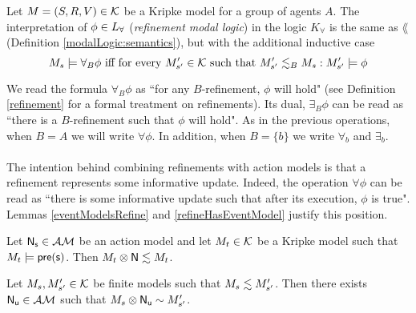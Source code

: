 \begin{defn} \label{refineLogic:semantics}
Let $M = (S, R, V) \in \mathcal{K}$ be a Kripke model for a group of agents $A$.
The interpretation of $\phi \in L_{\forall}$ ({\em refinement modal logic}) in the logic $K_\forall$ is the same as $\lang$
(Definition \ref{modalLogic:semantics}), but with the additional inductive case
\[
	M_s \models \forall_B \phi \text{ iff for every } M'_{s'} \in
  \mathcal{K} \text{ such that } M'_{s'}
	\lesssim_B M_s : M'_{s'} \models \phi
\]
\end{defn}

We read the formula $\forall_B \phi$ as ``for any $B$-refinement, $\phi$ will hold" (see Definition
\ref{refinement} for a formal treatment on refinements).
Its dual, $\exists_B \phi$ can be read as ``there is a $B$-refinement such that $\phi$ will hold".
As in the previous operations, when $B = A$ we will write $\forall \phi$.
In addition, when $B = \{b\}$ we write $\forall_b$ and $\exists_b$.\\
\\
The intention behind combining refinements with action models is that a refinement represents some
informative update.
Indeed, the operation $\forall \phi$ can be read as ``there is some informative update such that
after its execution, $\phi$ is true".
Lemmas \ref{eventModelsRefine} and \ref{refineHasEventModel} justify this position.

\begin{lemma} \label{eventModelsRefine}
Let $\mathrm{\mathsf{\mathrm{\mathsf{N}}_s}} \in \mathcal{AM}$ be an action model and let $M_t \in \mathcal{K}$ be a Kripke
model such that $M_t \models \mathrm{\mathsf{pre(s)}}$.
Then $M_t \otimes \mathrm{\mathsf{\mathrm{\mathsf{N}}}} \lesssim M_t$.
\end{lemma}

\begin{lemma} \label{refineHasEventModel}
	Let $M_s, M'_{s'} \in \mathcal{K}$ be finite models such that $M_s \lesssim
	M'_{s'}$.
	Then there exists $\mathrm{\mathsf{N}}_\mathrm{\mathsf{u}} \in \mathcal{AM}$ such that $M_s \otimes \mathrm{\mathsf{N}}_\mathrm{\mathsf{u}} \sim
	M'_{s'}$.
\end{lemma}

